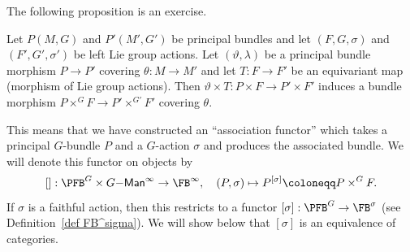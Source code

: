 The following proposition is an exercise.
\begin{prop}[{{\cite[Prop.~1.2.2]{RS2}}}]\label{prop 1.2.2 RS2}
    Let $P(M,G)$ and $P'(M',G')$ be principal bundles and let $(F,G,\sigma)$ and $(F',G',\sigma')$ be left Lie group actions. Let $(\vartheta,\lambda)$ be a principal bundle morphism $P\to P'$ covering $\theta:M\to M'$ and let $T:F\to F'$ be an equivariant map (morphism of Lie group actions). Then $\vartheta\times T:P\times F\to P'\times F'$ induces a bundle morphism $P\times^G F\to P'\times^{G'} F'$ covering $\theta$.
\end{prop}

This means that we have constructed an ``association functor'' which takes a principal $G$-bundle $P$ and a $G$-action $\sigma$ and produces the associated bundle. We will denote this functor on objects by
\[[]:\PFB^G\times G\mathsf{-Man}^\infty \to \FB^\infty,\quad (P,\sigma)\mapsto P^{[\sigma]}\coloneqq P\times^G F.\]
If $\sigma$ is a faithful action, then this restricts to a functor
$[\sigma]:\PFB^G\to \FB^\sigma$ (see Definition~\ref{def FB^sigma}). We will show below that $[\sigma]$ is an equivalence of categories.


